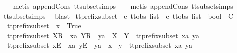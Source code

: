\begin{isabellebody}
\ \ \isamarkupfalse%
\ {\isacharparenleft}metis\ append{\isacharunderscore}Cons\ tt{\isacharunderscore}subset{\isachardot}simps{\isacharparenleft}{}{\isacharparenright}{\isacharparenright}\isanewline
\ \ \isamarkupfalse%
\ {\isacharparenleft}metis\ append{\isacharunderscore}Cons\ tt{\isacharunderscore}subset{\isachardot}simps{\isacharparenleft}{}{\isacharparenright}{\isacharparenright}\isanewline
\ \ \isamarkupfalse%
\ tt{\isacharunderscore}subset{\isachardot}simps{\isacharparenleft}{}{\isacharparenright}\ \isamarkupfalse%
\ blast{\isacharplus}%
\endisatagproof
{\isafoldproof}%
%
\isadelimproof
%
\endisadelimproof
%
\isadelimdocument
%
\endisadelimdocument
%
\isatagdocument
%
\isamarkuptrue%
%
\endisatagdocument
{\isafolddocument}%
%
\isadelimdocument
%
\endisadelimdocument
{}\isamarkupfalse%
\ tt{\isacharunderscore}prefix{\isacharunderscore}subset\ {\isacharcolon}{\isacharcolon}\ {\isachardoublequoteopen}{\isacharprime}e\ ttobs\ list\ {\isasymRightarrow}\ {\isacharprime}e\ ttobs\ list\ {\isasymRightarrow}\ bool{\isachardoublequoteclose}\ {\isacharparenleft}\ {\isachardoublequoteopen}{\isasymlesssim}\isactrlsub C{\isachardoublequoteclose}\ {}{}{\isacharparenright}\ \isanewline
\ \ {\isachardoublequoteopen}tt{\isacharunderscore}prefix{\isacharunderscore}subset\ {\isacharbrackleft}{\isacharbrackright}\ x\ {\isacharequal}\ True{\isachardoublequoteclose}\ {\isacharbar}\isanewline
\ \ {\isachardoublequoteopen}tt{\isacharunderscore}prefix{\isacharunderscore}subset\ {\isacharparenleft}{\isacharbrackleft}X{\isacharbrackright}\isactrlsub R\ {\isacharhash}\ xa{\isacharparenright}\ {\isacharparenleft}{\isacharbrackleft}Y{\isacharbrackright}\isactrlsub R\ {\isacharhash}\ ya{\isacharparenright}\ {\isacharequal}\ {\isacharparenleft}X\ {\isasymsubseteq}\ Y\ {\isasymand}\ tt{\isacharunderscore}prefix{\isacharunderscore}subset\ xa\ ya{\isacharparenright}{\isachardoublequoteclose}\ {\isacharbar}\isanewline
\ \ {\isachardoublequoteopen}tt{\isacharunderscore}prefix{\isacharunderscore}subset\ {\isacharparenleft}{\isacharbrackleft}x{\isacharbrackright}\isactrlsub E\ {\isacharhash}\ xa{\isacharparenright}\ {\isacharparenleft}{\isacharbrackleft}y{\isacharbrackright}\isactrlsub E\ {\isacharhash}\ ya{\isacharparenright}\ {\isacharequal}\ {\isacharparenleft}x\ {\isacharequal}\ y\ {\isasymand}\ tt{\isacharunderscore}prefix{\isacharunderscore}subset\ xa\ ya{\isacharparenright}{\isachardoublequoteclose}\ {\isacharbar}\isanewline

\end{isabellebody}
